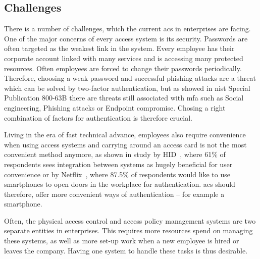 \subsection{Challenges} \label{challenges}

There is a number of challenges, which the current \acrshort{acs} in enterprises are facing. One of the major concerns of every access system is its security. Passwords are often targeted as the weakest link in the system. Every employee has their corporate account linked with many services and is accessing many protected resources. Often employees are forced to change their passwords periodically. Therefore, choosing a weak password and successful phishing attacks are a threat which can be solved by two-factor authentication, but as showed in \acrshort{nist} Special Publication 800-63B \cite{Grassi2017DigitalManagement} there are threats still associated with \acrshort{mfa} such as Social engineering, Phishing attacks or Endpoint compromise. Chosing a right combination of factors for authentication is therefore crucial.

Living in the era of fast technical advance, employees also require convenience when using access systems and carrying around an access card is not the most convenient method anymore, as shown in study by HID~\cite{2017AccessGlobal}, where 61\% of respondents sees integration between systems as hugely beneficial for user convenience or by Netflix~\cite{2012NetflixPilot}, where 87.5\% of respondents would like to use smartphones to open doors in the workplace for authentication. \acrshort{acs} should therefore, offer more convenient ways of authentication -- for example a smartphone.

Often, the physical access control and access policy management systems are two separate entities in enterprises. This requires more resources spend on managing these systems, as well as more set-up work when a new employee is hired or leaves the company. Having one system to handle these tasks is thus desirable.